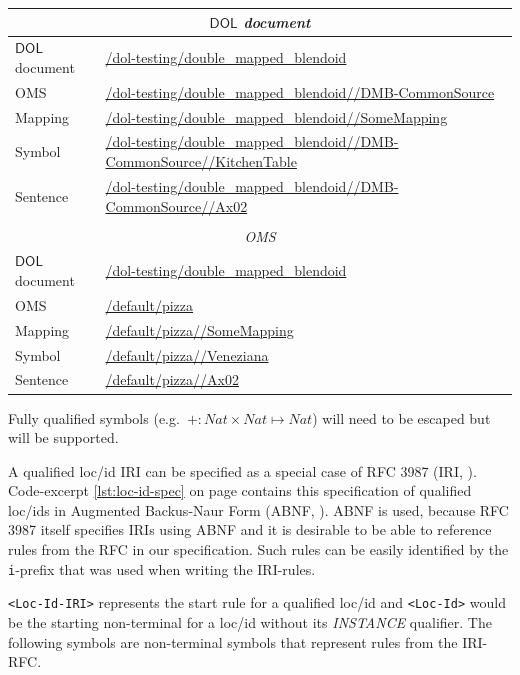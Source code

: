 \documentclass[10pt, a4paper]{isov2}
\newcommand*{\DOL}{\ensuremath{\mathsf{DOL}}\xspace}
\begin{document}
\begin{tabularx}{\textwidth}{p{}p{}}
  \multicolumn{2}{c}{\emph{\DOL document}} \\
  \hline
  \DOL document & \url{/dol-testing/double_mapped_blendoid}\\
  OMS & \url{/dol-testing/double_mapped_blendoid//DMB-CommonSource}\\
  Mapping & \url{/dol-testing/double_mapped_blendoid//SomeMapping}\\
  Symbol & \url{/dol-testing/double_mapped_blendoid//DMB-CommonSource//KitchenTable}\\
  Sentence & \url{/dol-testing/double_mapped_blendoid//DMB-CommonSource//Ax02}\\
  & \\
  \multicolumn{2}{c}{\emph{OMS}} \\
  \hline
  \DOL document & \url{/dol-testing/double_mapped_blendoid}\\
  OMS & \url{/default/pizza}\\
  Mapping & \url{/default/pizza//SomeMapping}\\
  Symbol & \url{/default/pizza//Veneziana}\\
  Sentence & \url{/default/pizza//Ax02}\\
\end{tabularx}

Fully qualified symbols (e.g.\ $+:Nat \times Nat\mapsto Nat$) will need to be escaped
but will be supported.



 A qualified loc/id IRI can be specified as a special case of RFC 3987 (IRI,
\cite{rfc3987}). Code-excerpt \ref{lst:loc-id-spec} on page
\pageref{lst:loc-id-spec} contains this specification of qualified loc/ids in
Augmented Backus-Naur Form (ABNF, \cite{rfc5234}). ABNF is used, because
RFC 3987 itself specifies IRIs using ABNF and it is desirable to be able to reference
rules from the RFC in our specification. Such rules can be easily identified by
the \texttt{i}-prefix that was used when writing the IRI-rules.

\texttt{<Loc-Id-IRI>} represents the start rule for a qualified loc/id and
\texttt{<Loc-Id>} would be the starting non-terminal for a loc/id without its
\emph{INSTANCE} qualifier. The following symbols are non-terminal symbols that
represent rules from the IRI-RFC.
\end{document}
